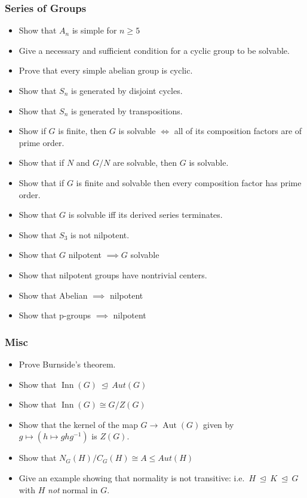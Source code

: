 \hypertarget{series-of-groups}{%
\subsubsection{Series of Groups}\label{series-of-groups}}

\begin{itemize}
\item
  Show that \(A_n\) is simple for \(n\geq 5\)
\item
  Give a necessary and sufficient condition for a cyclic group to be
  solvable.
\item
  Prove that every simple abelian group is cyclic.
\item
  Show that \(S_n\) is generated by disjoint cycles.
\item
  Show that \(S_n\) is generated by transpositions.
\item
  Show if \(G\) is finite, then \(G\) is solvable \(\iff\) all of its
  composition factors are of prime order.
\item
  Show that if \(N\) and \(G/N\) are solvable, then \(G\) is solvable.
\item
  Show that if \(G\) is finite and solvable then every composition
  factor has prime order.
\item
  Show that \(G\) is solvable iff its derived series terminates.
\item
  Show that \(S_3\) is not nilpotent.
\item
  Show that \(G\) nilpotent \(\implies G\) solvable
\item
  Show that nilpotent groups have nontrivial centers.
\item
  Show that Abelian \(\implies\) nilpotent
\item
  Show that p-groups \(\implies\) nilpotent
\end{itemize}

\hypertarget{misc}{%
\subsubsection{Misc}\label{misc}}

\begin{itemize}
\item
  Prove Burnside's theorem.
\item
  Show that \(\mathop{\mathrm{Inn}}(G) {~\trianglelefteq~}Aut(G)\)
\item
  Show that \(\mathop{\mathrm{Inn}}(G) \cong G / Z(G)\)
\item
  Show that the kernel of the map \(G\to \mathop{\mathrm{Aut}}(G)\)
  given by \(g\mapsto (h\mapsto ghg^{-1})\) is \(Z(G)\).
\item
  Show that \(N_G(H) / C_G(H) \cong A \leq Aut(H)\)
\item
  Give an example showing that normality is not transitive:
  i.e.~\(H{~\trianglelefteq~}K {~\trianglelefteq~}G\) with \(H\)
  \emph{not} normal in \(G\).
\end{itemize}

